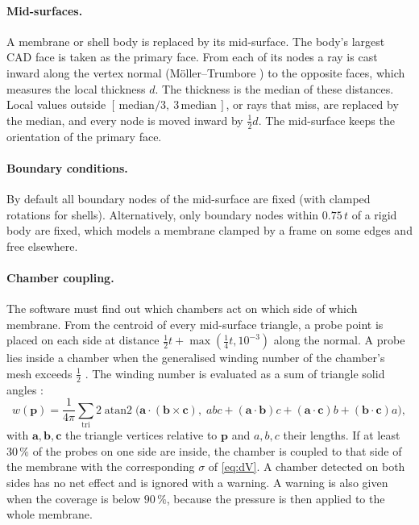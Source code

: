 \documentclass[11pt,a4paper]{article}
\newcommand{\vect}[1]{\bm{#1}}
\theoremstyle{remark}
\begin{document}
\paragraph{Mid-surfaces.} A membrane or shell body is replaced by its mid-surface. The body's
largest CAD face is taken as the primary face. From each of its nodes a ray is cast inward along
the vertex normal (Möller--Trumbore \cite{moller1997}) to the opposite faces, which measures the
local thickness $d$. The thickness is the median of these distances. Local values outside
$[\,\text{median}/3,\ 3\,\text{median}\,]$, or rays that miss, are replaced by the median, and
every node is moved inward by $\tfrac12 d$. The mid-surface keeps the orientation of the primary
face.

\paragraph{Boundary conditions.} By default all boundary nodes of the mid-surface are fixed (with
clamped rotations for shells). Alternatively, only boundary nodes within $0.75\,t$ of a rigid body
are fixed, which models a membrane clamped by a frame on some edges and free elsewhere.

\paragraph{Chamber coupling.} The software must find out which chambers act on which side of which
membrane. From the centroid of every mid-surface triangle, a probe point is placed on each side at
distance $\tfrac12 t + \max(\tfrac14 t, 10^{-3})$ along the normal. A probe lies inside a chamber
when the generalised winding number of the chamber's mesh exceeds $\tfrac12$
\cite{jacobson2013}. The winding number is evaluated as a sum of triangle solid angles
\cite{vanoosterom1983}:
\begin{equation}
w(\vect{p}) = \frac{1}{4\pi}\sum_{\text{tri}} 2\operatorname{atan2}\Big(\vect{a}\cdot(\vect{b}\times\vect{c}),\;
abc + (\vect{a}\cdot\vect{b})c + (\vect{a}\cdot\vect{c})b + (\vect{b}\cdot\vect{c})a\Big),
\end{equation}
with $\vect{a},\vect{b},\vect{c}$ the triangle vertices relative to $\vect{p}$ and $a,b,c$ their
lengths. If at least $30\,\%$ of the probes on one side are inside, the chamber is coupled to that
side of the membrane with the corresponding $\sigma$ of \eqref{eq:dV}. A chamber detected on both
sides has no net effect and is ignored with a warning. A warning is also given when the coverage
is below $90\,\%$, because the pressure is then applied to the whole membrane.
\end{document}
